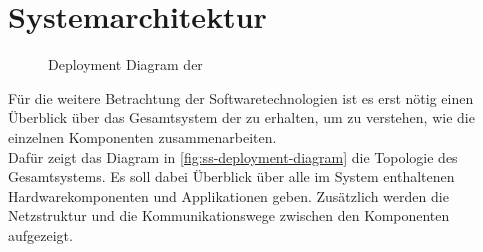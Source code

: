 \chapter{Systemarchitektur}
\label{chap:systemarchitektur}

\begin{figure}
    \centering
    
    \caption{Deployment Diagram der \shst{}}
    \label{fig:ss-deployment-diagram}
\end{figure}

Für die weitere Betrachtung der Softwaretechnologien ist es erst nötig einen Überblick über 
das Gesamtsystem der \shst{} zu erhalten, um zu verstehen, wie die einzelnen Komponenten
zusammenarbeiten.\\
Dafür zeigt das Diagram in \autoref{fig:ss-deployment-diagram} die Topologie des Gesamtsystems.
Es soll dabei Überblick über alle im System enthaltenen Hardwarekomponenten und Applikationen
geben. Zusätzlich werden die Netzstruktur und die Kommunikationswege zwischen den Komponenten 
aufgezeigt.\\

